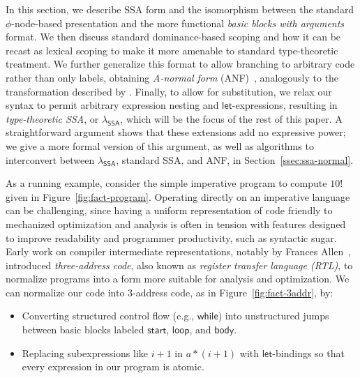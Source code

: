 \documentclass[acmsmall,screen,review]{acmart}
\newcommand{\ms}[1]{\ensuremath{\mathsf{#1}}}
\newcommand{\isotopessa}{\(\lambda_{\ms{SSA}}\)}
\begin{document}
In this section, we describe SSA form and the isomorphism between the standard $\phi$-node-based
presentation and the more functional \emph{basic blocks with arguments} format. We then discuss
standard dominance-based scoping and how it can be recast as lexical scoping to make it more
amenable to standard type-theoretic treatment. We further generalize this format to allow branching
to arbitrary code rather than only labels, obtaining \emph{A-normal form}
(ANF)~\cite{flanagan-93-anf}, analogously to the transformation described by
\citet{chakravarty-functional-ssa-2003}. Finally, to allow for substitution, we relax our syntax to
permit arbitrary expression nesting and \ms{let}-expressions, resulting in \emph{type-theoretic
SSA}, or \isotopessa{}, which will be the focus of the rest of this paper. A straightforward
argument shows that these extensions add no expressive power; we give a more formal version of this
argument, as well as algorithms to interconvert between \isotopessa{}, standard SSA, and ANF, in
Section~\ref{ssec:ssa-normal}.

As a running example, consider the simple imperative program to compute $10!$ given in
Figure~\ref{fig:fact-program}. Operating directly on an imperative language can be challenging,
since having a uniform representation of code friendly to mechanized optimization and analysis is
often in tension with features designed to improve readability and programmer productivity, such as
syntactic sugar. Early work on compiler intermediate representations, notably by Frances
Allen~\cite{allen-70-cfa}, introduced \emph{three-address code}, also known as \emph{register
transfer language (RTL)},  to normalize programs into a form more suitable for analysis and
optimization. We can normalize our code into 3-address code, as in Figure~\ref{fig:fact-3addr}, by:
\begin{itemize}
  \item Converting structured control flow (e.g., \ms{while}) into unstructured jumps between basic
  blocks labeled \ms{start}, \ms{loop}, and \ms{body}.
  \item Replacing subexpressions like $i + 1$ in $a * (i + 1)$ with \ms{let}-bindings so that every
  expression in our program is atomic.
\end{itemize}
\end{document}
